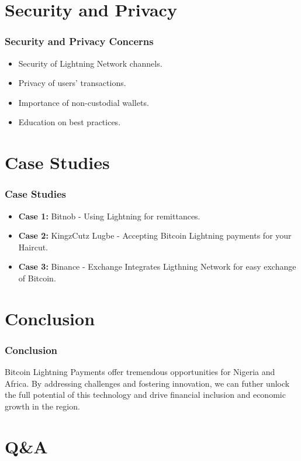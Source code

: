 \documentclass[aspectratio=169]{beamer}
\begin{document}
\section{Security and Privacy}

\begin{frame}
\frametitle{Security and Privacy Concerns}
\begin{itemize}
    \item Security of Lightning Network channels.
    \item Privacy of users' transactions.
    \item Importance of non-custodial wallets.
    \item Education on best practices.
\end{itemize}
\end{frame}

\section{Case Studies}

\begin{frame}
\frametitle{Case Studies}
\begin{itemize}
    \item \textbf{Case 1:} Bitnob - Using Lightning for remittances.
    \item \textbf{Case 2:} KingzCutz Lugbe - Accepting Bitcoin Lightning payments for your Haircut.
    \item \textbf{Case 3:} Binance - Exchange Integrates Ligthning Network for easy exchange of Bitcoin.
\end{itemize}
\end{frame}

\section{Conclusion}

\begin{frame}
\frametitle{Conclusion}
Bitcoin Lightning Payments offer tremendous opportunities for Nigeria and Africa. By addressing challenges and fostering innovation, we can futher unlock the full potential of this technology and drive financial inclusion and economic growth in the region.
\end{frame}

\section{Q\&A}
\end{document}
